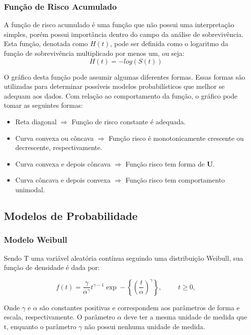 \documentclass[12pt,a4paper]{article}
\begin{document}
\subsubsection{Função de Risco Acumulado}

A função de risco acumulado é uma função que não possui uma interpretação simples, porém possui importância dentro do campo da análise de sobrevivência. Esta função, denotada como $H(t)$, pode ser definida como o logaritmo da função de sobrevivência multiplicado por menos um, ou seja:
\begin{equation} \label{eq:riskcum}
 H(t) = -log(S(t))
\end{equation}

O gráfico desta função pode assumir algumas diferentes formas. Essas formas são utilizadas para determinar possíveis modelos probabilísticos que melhor se adequam aos dados. Com relação ao comportamento da função, o gráfico pode tomar as seguintes formas:

\begin{itemize}
	\item Reta diagonal $\Rightarrow$ Função de risco constante é adequada.
	\item Curva convexa ou côncava $\Rightarrow$ Função
risco é monotonicamente crescente ou decrescente, respectivamente.
	\item Curva convexa e depois côncava $\Rightarrow$ Função risco tem forma de \textbf{U}.
	\item Curva côncava e depois convexa $\Rightarrow$ Função risco tem comportamento unimodal.
\end{itemize}

\subsection{Modelos de Probabilidade}

\subsubsection{Modelo Weibull}
Sendo T uma variável aleatória contínua seguindo uma distribuição Weibull, sua função de densidade é dada por:

$$ f(t) = \dfrac{\gamma}{\alpha^{\gamma}}t^{\gamma-1}\exp-\left\lbrace\left(\dfrac{t}{\alpha}\right)^{\gamma}\right\rbrace, \hspace{1cm} t \ge 0,$$

Onde $\gamma$ e $\alpha$ são constantes positivas e correspondem aos parâmetros de forma e escala, respectivamente. O parâmetro $\alpha$ deve ter a mesma unidade de medida que t, enquanto o parâmetro $\gamma$ não possui nenhuma unidade de medida.
\end{document}
